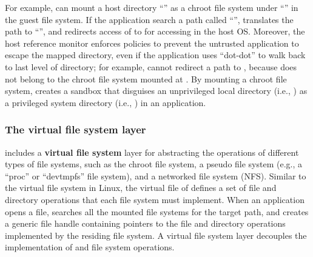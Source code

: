  



For example, \thelibos{} can mount a host directory ``'' as a chroot file system under ``'' in the guest file system.
If the application search a path called ``'', \thelibos{} translates the path to ``'', and redirects access of  to \hostapis{} for accessing  in the host OS.
Moreover, the host reference monitor enforces policies
to prevent the untrusted application
to escape the mapped directory, even if the application uses ``dot-dot'' to walk back to last level of directory; for example, \thelibos{} cannot redirect a path  to , because  does not belong to the chroot file system mounted at .
By mounting a chroot file system, \thelibos{} creates a sandbox that disguises an unprivileged local directory (i.e., )
as a privileged system directory (i.e., ) in an application.
  



\subsubsection{The virtual file system layer}







\thelibos{} includes a {\bf virtual file system} layer for abstracting the operations
of different types of file systems,
such as the chroot file system, a pseudo file system (e.g., a ``proc'' or ``devtmpfs'' file system), and a networked file system (NFS).
Similar to the virtual file system in Linux,
the virtual file of \thelibos{} defines a set of file and directory operations that
each file system must implement.
When an application opens a file,
\thelibos{} searches all the mounted file systems for the target path,
and creates a generic file handle containing pointers
to the file and directory operations implemented by the residing file system.
A virtual file system layer decouples
the implementation of \linuxapis{} and file system operations.


